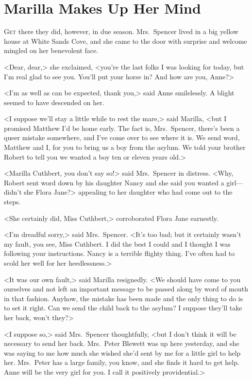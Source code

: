 \chapter{Marilla Makes Up Her Mind}

\lettrine{G}{et} there they did, however, in due season. Mrs.~Spencer lived in a big yellow house at White Sands Cove, and she came to the door with surprise and welcome mingled on her benevolent face.

\zz
<Dear, dear,> she exclaimed, <you're the last folks I was looking for today, but I'm real glad to see you. You'll put your horse in? And how are you, Anne?>

<I'm as well as can be expected, thank you,> said Anne smilelessly. A blight seemed to have descended on her.

<I suppose we'll stay a little while to rest the mare,> said Marilla, <but I promised Matthew I'd be home early. The fact is, Mrs.~Spencer, there's been a queer mistake somewhere, and I've come over to see where it is. We send word, Matthew and I, for you to bring us a boy from the asylum. We told your brother Robert to tell you we wanted a boy ten or eleven years old.>

<Marilla Cuthbert, you don't say so!> said Mrs.~Spencer in distress. <Why, Robert sent word down by his daughter Nancy and she said you wanted a girl—didn't she Flora Jane?> appealing to her daughter who had come out to the steps.

<She certainly did, Miss Cuthbert,> corroborated Flora Jane earnestly.

<I'm dreadful sorry,> said Mrs.~Spencer. <It's too bad; but it certainly wasn't my fault, you see, Miss Cuthbert. I did the best I could and I thought I was following your instructions. Nancy is a terrible flighty thing. I've often had to scold her well for her heedlessness.>

<It was our own fault,> said Marilla resignedly. <We should have come to you ourselves and not left an important message to be passed along by word of mouth in that fashion. Anyhow, the mistake has been made and the only thing to do is to set it right. Can we send the child back to the asylum? I suppose they'll take her back, won't they?>

<I suppose so,> said Mrs.~Spencer thoughtfully, <but I don't think it will be necessary to send her back. Mrs.~Peter Blewett was up here yesterday, and she was saying to me how much she wished she'd sent by me for a little girl to help her. Mrs.~Peter has a large family, you know, and she finds it hard to get help. Anne will be the very girl for you. I call it positively providential.>

